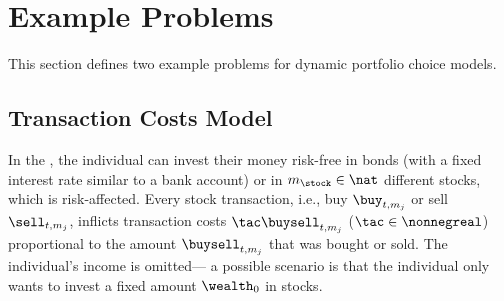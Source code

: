 \section{Example Problems}
\label{sec:83problem}


\noindent
This section defines two example problems for
dynamic portfolio choice models.



\subsection{Transaction Costs Model}

In the  \cite{Schober18Solving},
the individual can invest their money risk-free in bonds
(with a fixed interest rate similar to a bank account)
or in $m_{\stock} \in \nat$ different stocks, which is risk-affected.
Every stock transaction,
i.e., buy $\buy_{t,m_j}$ or sell $\sell_{t,m_j}$,
inflicts transaction costs $\tac \buysell_{t,m_j}$ ($\tac \in \nonnegreal$)
proportional to the amount $\buysell_{t,m_j}$ that was bought or sold.
The individual's income is omitted---%
a possible scenario is that the individual only wants to invest a fixed
amount $\wealth_0$ in stocks.

